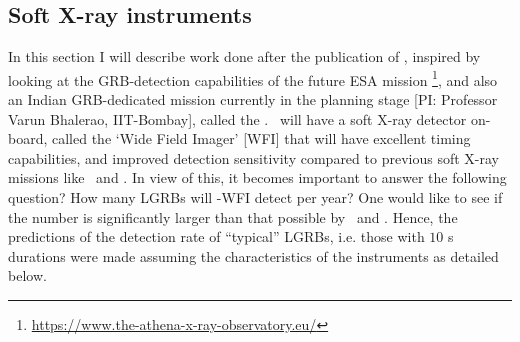 \subsection{Soft X-ray instruments}
\label{subsec:predictions_for_soft_Xray_instruments--long}
In this section I will describe work done after the publication of , inspired by looking at the GRB-detection capabilities of the future ESA mission \A\footnote{\url{https://www.the-athena-x-ray-observatory.eu/}}, and also an Indian GRB-dedicated mission currently in the planning stage [PI: Professor Varun Bhalerao, IIT-Bombay], called the \D. \A\ will have a soft X-ray detector on-board, called the `Wide Field Imager' [WFI] that will have excellent timing capabilities, and improved detection sensitivity compared to previous soft X-ray missions like \X\, and \C. In view of this, it becomes important to answer the following question? How many LGRBs will \A -WFI detect per year? One would like to see if the number is significantly larger than that possible by \X\, and \C. Hence, the predictions of the detection rate of ``typical'' LGRBs, i.e. those with $10$ s durations were made assuming the characteristics of the instruments as detailed below.

